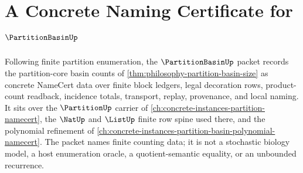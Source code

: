\chapter{A Concrete Naming Certificate for $\PartitionBasinUp$}
\label{ch:concrete-instances-partition-basin-namecert}

Following finite partition enumeration, the $\PartitionBasinUp$ packet records the partition-core basin counts of \autoref{thm:philosophy-partition-basin-size} as concrete NameCert data over finite block ledgers, legal decoration rows, product-count readback, incidence totals, transport, replay, provenance, and local naming. It sits over the $\PartitionUp$ carrier of \autoref{ch:concrete-instances-partition-namecert}, the $\NatUp$ and $\ListUp$ finite row spine used there, and the polynomial refinement of \autoref{ch:concrete-instances-partition-basin-polynomial-namecert}. The packet names finite counting data; it is not a stochastic biology model, a host enumeration oracle, a quotient-semantic equality, or an unbounded recurrence.

